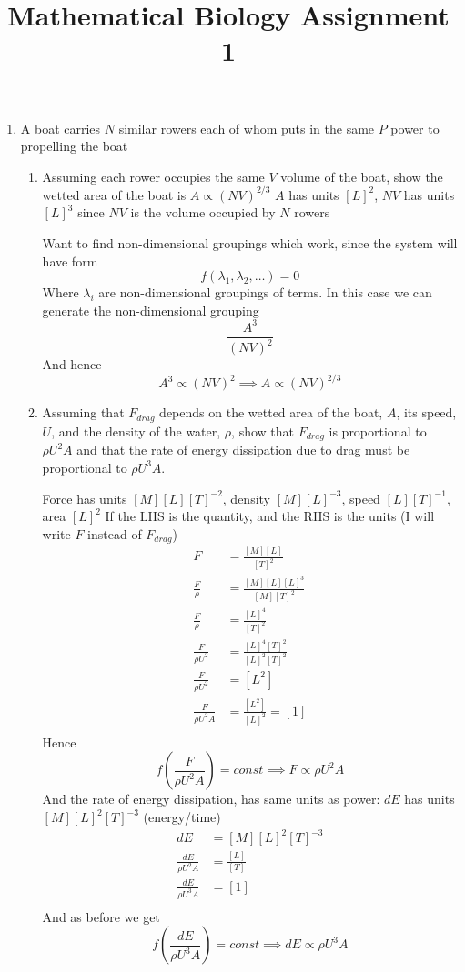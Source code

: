 \documentclass{X:/Documents/Coding/Latex/myassignment}
\title{Mathematical Biology Assignment 1}
\begin{document}
\maketitle

\begin{enumerate}


	\item A boat carries $N$ similar rowers each of whom puts in the same $P$ power to propelling the boat
	\begin{enumerate}
		\item Assuming each rower occupies the same $V$ volume of the boat, show the wetted area of the boat is $A \propto(NV)^{2/3}$
		$A$ has units $[L]^2$, $NV$ has units  $[L]^3$ since $NV$ is the volume occupied by $N$ rowers

		Want to find non-dimensional groupings which work, since the system will have form
		\[f\left(\lambda_1,\lambda_2,\ldots \right) =0 \]
		Where $\lambda_i$ are non-dimensional groupings of terms.
		In this case we can generate the non-dimensional grouping
		\[\frac{A^{3}}{(NV)^{2}}\]
		And hence
		\[A^3 \propto (NV)^2 \implies A \propto (NV)^{2/3}\]
		\item Assuming that $F_{drag}$ depends on the wetted area of the boat, $A$, its speed, $U$, and the density of the water, $\rho$, show that $F_{drag}$ is proportional to $\rho U^2 A$ and that the rate of energy dissipation due to drag must be proportional to $\rho U^3 A$.

		Force has units $[M][L][T]^{-2}$, density $[M][L]^{-3}$, speed $[L][T]^{-1}$, area $[L]^2$
		If the LHS is the quantity, and the RHS is the units (I will write $F$ instead of $F_{drag}$)
		\begin{align*}
			F &= \frac{[M][L]}{[T]^2}\\
			\frac{F}{\rho} &= \frac{[M][L][L]^3}{[M][T]^2}\\
			\frac{F}{\rho} &= \frac{[L]^4}{[T]^2}\\
			\frac{F}{\rho U^2} &= \frac{[L]^4[T]^2}{[L]^2[T]^2}\\
			\frac{F}{\rho U^2} &= [L^2]\\
			\frac{F}{\rho U^2A} &= \frac{[L^2]}{[L]^2} = [1]\\
		\end{align*}
		Hence
		\[f\left(\frac{F}{\rho U^2A}\right) = const \implies F \propto \rho U^2A\]
		And the rate of energy dissipation, has same units as power: $dE$ has units $[M][L]^2[T]^{-3}$ (energy/time)
		\begin{align*}
			dE &= [M][L]^2[T]^{-3}\\
			\frac{dE}{\rho U^2A} &= \frac{[L]}{[T]}\\
			\frac{dE}{\rho U^3A} &= [1]\\
		\end{align*}
		And as before we get
		\[f\left(\frac{dE}{\rho U^3A}\right) = const \implies dE \propto \rho U^3A\]



\end{enumerate}
\end{enumerate}
\end{document}

